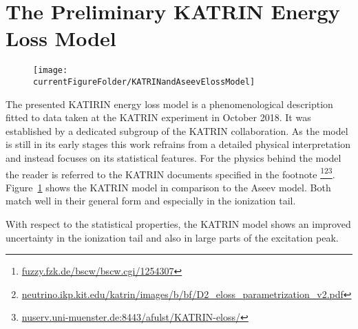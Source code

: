 \section{The Preliminary KATRIN Energy Loss Model}
\label{sec:katrinElossModel}
\begin{figure}[tbh]
	\centering
	\texttt{[image: \\currentFigureFolder/KATRINandAseevElossModel]}
	\label{fig:katrinElossElossModel}
\end{figure}
The presented KATIRIN energy loss model is a phenomenological description fitted to data taken at the KATRIN experiment in October 2018. It was established by a dedicated subgroup of the KATRIN collaboration. As the model is still in its early stages this work refrains from a detailed physical interpretation and instead focuses on its statistical features. For the physics behind the model the reader is referred to the KATRIN documents specified in the footnote \footnote{\url{fuzzy.fzk.de/bscw/bscw.cgi/1254307}}\footnote{\url{neutrino.ikp.kit.edu/katrin/images/b/bf/D2_eloss_parametrization_v2.pdf}}\footnote{\url{nuserv.uni-muenster.de:8443/afulst/KATRIN-eloss/}}. Figure~\ref{fig:katrinElossElossModel} shows the KATRIN model in comparison to the Aseev model. Both match well in their general form and especially in the ionization tail.

With respect to the statistical properties, the KATRIN model shows an improved uncertainty in the ionization tail and also in large parts of the excitation peak.

